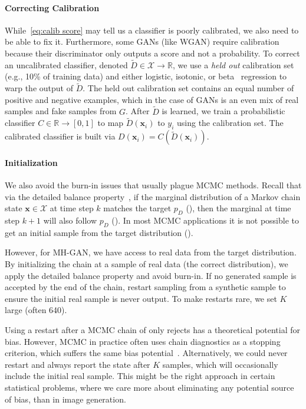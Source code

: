 \documentclass{article}
\renewcommand{\vec}[1]{{\boldsymbol{\mathbf{#1}}}} %
\newcommand{\R}{\mathbb{R}}
\newcommand{\set}[1]{\mathcal{#1}}
\newcommand{\sample}{\sim}
\newcommand{\PD}{{p_D}}
\newcommand{\setx}{\set{X}}
\begin{document}
\paragraph{Correcting Calibration}
While~\eqref{eq:calib score} may tell us a classifier is poorly calibrated, we also need to be able to fix it.
Furthermore, some GANs (like WGAN) require calibration because their discriminator only outputs a score and not a probability.
To correct an uncalibrated classifier, denoted $\tilde{D} \in \setx \rightarrow \R$, we use a \emph{held out} calibration set (e.g., 10\% of training data) and either logistic, isotonic, or beta~\citep{Kull2017} regression to warp the output of $\tilde{D}$.
The held out calibration set contains an equal number of positive and negative examples, which in the case of GANs is an even mix of real samples and fake samples from $G$.
After $\tilde{D}$ is learned, we train a probabilistic classifier $C \in \R \rightarrow [0,1]$ to map $\tilde{D}(\vec x_i)$ to $y_i$ using the calibration set.
The calibrated classifier is built via $D(\vec x_i) = C(\tilde{D}(\vec x_i))$.

\paragraph{Initialization}
We also avoid the burn-in issues that usually plague MCMC methods.
Recall that via the detailed balance property~\citep[Ch.~1]{Gilks1996}, if the marginal distribution of a Markov chain state $\vec x \in \setx$ at time step $k$ matches the target $\PD$ (\smash{$\vec x_k \sample \PD$}), then the marginal at time step $k+1$ will also follow $\PD$ (\smash{$\vec x_{k+1} \sample \PD$})\@.
In most MCMC applications it is not possible to get an initial sample from the target distribution (\smash{$\vec x_0 \sample \PD$})\@.

However, for MH-GAN, we have access to real data from the target distribution.
By initializing the chain at a sample of real data (the correct distribution), we apply the detailed balance property and avoid burn-in.
If no generated sample is accepted by the end of the chain, restart sampling from a synthetic sample to ensure the initial real sample is never output.
To make restarts rare, we set $K$ large (often 640)\@.

Using a restart after a MCMC chain of only rejects has a theoretical potential for bias.
However, MCMC in practice often uses chain diagnostics as a stopping criterion, which suffers the same bias potential~\citep{Cowles1999}.
Alternatively, we could never restart and always report the state after $K$ samples, which will occasionally include the initial real sample.
This might be the right approach in certain statistical problems, where we care more about eliminating any potential source of bias, than in image generation.
\end{document}
